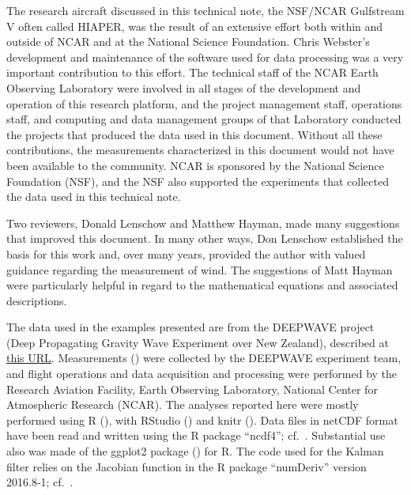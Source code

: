 \documentclass[12pt,twoside,english,12pt,twoside,english]{article}\usepackage[]{graphicx}\usepackage[]{color}
\let\OrgIndex\index
\renewcommand*{\index}[1]{\OrgIndex{#1}}
\begin{document}
The research aircraft discussed in this technical note, the NSF/NCAR
Gulfstream V often called \textquotedbl{}HIAPER\textquotedbl{},
was the result of an extensive effort both within and outside of NCAR
and at the National Science Foundation. Chris Webster's development
and maintenance of the software used for data processing was a very
important contribution to this effort. The technical staff of the
NCAR Earth Observing Laboratory were involved in all stages of the
development and operation of this research platform, and the project
management staff, operations staff, and computing and data management
groups of that Laboratory conducted the projects that produced the
data used in this document. Without all these contributions, the measurements
characterized in this document would not have been available to the
community. NCAR is sponsored by the National Science Foundation (NSF),
and the NSF also supported the experiments that collected the data
used in this technical note.

Two reviewers, Donald Lenschow and Matthew Hayman, made many suggestions
that improved this document. In many other ways, Don Lenschow established
the basis for this work and, over many years, provided the author
with valued guidance regarding the measurement of wind. The suggestions
of Matt Hayman were particularly helpful in regard to the mathematical
equations and associated descriptions.

The data used in the examples presented are from the DEEPWAVE
project (Deep Propagating Gravity Wave Experiment over New Zealand),
described at \href{https://www.eol.ucar.edu/field_projects/deepwave}{this URL}.
Measurements (\citealp{EOL_DEEPWAVE-_2015}) were collected by the
DEEPWAVE experiment team, and flight operations and data acquisition
and processing were performed by the Research Aviation Facility, Earth
Observing Laboratory, National Center for Atmospheric Research (NCAR).
The analyses reported here were mostly performed using R (\citet{Rlanguage}),
with RStudio (\citet{RStudio2012}) and knitr
(\citet{Xie2014a,Xie2014b}). Data files in netCDF format have been
read and written using the R package
``ncdf4''; cf.~\citet{ncdf4}. Substantial use also was made of
the ggplot2 package
(\citet{wickham2009}) for R. The code used for the Kalman filter
relies on the Jacobian function in the R
package ``numDeriv'' version
2016.8-1; cf.~\citet{numDeriv}.
\end{document}
